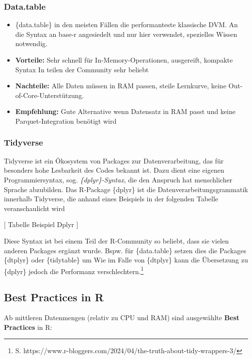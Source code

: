 \documentclass[
  german,
  10pt,
  twoside]{article}
\providecommand{\tightlist}{%
  \setlength{\itemsep}{0pt}\setlength{\parskip}{0pt}}
\begin{document}
\subsubsection{Data.table}\label{data.table}

\begin{itemize}
\tightlist
\item
  \{data.table\} in den meisten Fällen die performanteste klassische
  DVM. An die Syntax an base-r angesiedelt und nur hier verwendet,
  spezielles Wissen notwendig.
\item
  \textbf{Vorteile:} Sehr schnell für In-Memory-Operationen, ausgereift,
  kompakte Syntax In teilen der Community sehr beliebt
\item
  \textbf{Nachteile:} Alle Daten müssen in RAM passen, steile Lernkurve,
  keine Out-of-Core-Unterstützung.
\item
  \textbf{Empfehlung:} Gute Alternative wenn Datensatz in RAM passt und
  keine Parquet-Integration benötigt wird
\end{itemize}

\subsubsection{Tidyverse}\label{tidyverse}

Tidyverse ist ein Ökosystem von Packages zur Datenverarbeitung, das für
besonders hohe Lesbarkeit des Codes bekannt ist. Dazu dient eine eigenen
Programmiersyntax, sog. \emph{\{dplyr\}-Syntax}, die den Anspruch hat
menschlicher Sprache abzubilden. Das R-Package \{dplyr\} ist die
Datenverarbeitungsgrammatik innerhalb Tidyverse, die anhand eines
Beispiels in der folgenden Tabelle veranschaulicht wird

{[} Tabelle Beispiel Dplyr {]}

Diese Syntax ist bei einem Teil der R-Community so beliebt, dass sie
vielen anderen Packages ergänzt wurde. Bspw. für \{data.table\} setzen
dies die Packages \{dtplyr\} oder \{tidytable\} um Wie im Falle von
\{dtplyr\} kann die Übersetzung zu \{dplyr\} jedoch die Performanz
verschlechtern.\footnote{S.
  https://www.r-bloggers.com/2024/04/the-truth-about-tidy-wrappers-3/}

\subsection{Best Practices in R}\label{best-practices-in-r}

Ab mittleren Datenmengen (relativ zu CPU und RAM) sind ausgewählte
\textbf{Best Practices} in R:
\end{document}
